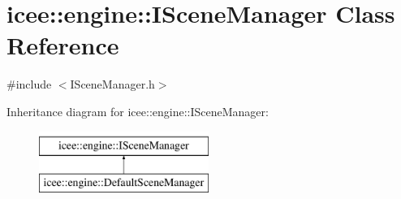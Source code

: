 \hypertarget{classicee_1_1engine_1_1ISceneManager}{
\section{icee::engine::ISceneManager Class Reference}
\label{classicee_1_1engine_1_1ISceneManager}
}


{\ttfamily \#include $<$ISceneManager.h$>$}

Inheritance diagram for icee::engine::ISceneManager:\begin{figure}[H]
\begin{center}
\leavevmode
\includegraphics[height=2.000000cm]{classicee_1_1engine_1_1ISceneManager}
\end{center}
\end{figure}
